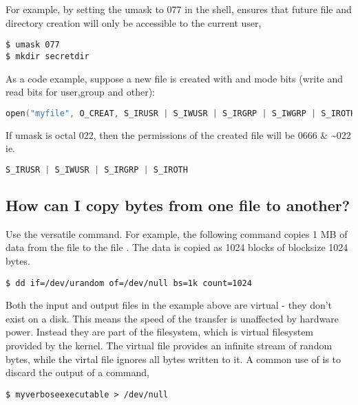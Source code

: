 For example, by setting the umask to 077 in the shell, ensures that future file and directory creation will only be accessible to the current user,

\begin{lstlisting}
$ umask 077
$ mkdir secretdir
\end{lstlisting}

As a code example, suppose a new file is created with  and mode bits  (write and read bits for user,group and other):

\begin{lstlisting}[language=C]
open("myfile", O_CREAT, S_IRUSR | S_IWUSR | S_IRGRP | S_IWGRP | S_IROTH | S_IWOTH);
\end{lstlisting}

If umask is octal 022, then the permissions of the created file will be 0666 \& \textasciitilde{}022 ie.

\begin{lstlisting}[language=C]
           S_IRUSR | S_IWUSR | S_IRGRP | S_IROTH
\end{lstlisting}

\subsection{How can I copy bytes from one file to another?}\label{how-can-i-copy-bytes-from-one-file-to-another}

Use the versatile  command. For example, the following command copies 1 MB of data from the file  to the file . The data is copied as 1024 blocks of blocksize 1024 bytes.

\begin{lstlisting}
$ dd if=/dev/urandom of=/dev/null bs=1k count=1024
\end{lstlisting}

Both the input and output files in the example above are virtual - they don't exist on a disk. This means the speed of the transfer is unaffected by hardware power. Instead they are part of the  filesystem, which is virtual filesystem provided by the kernel. The virtual file  provides an infinite stream of random bytes, while the virtal file  ignores all bytes written to it. A common use of  is to discard the output of a command,

\begin{lstlisting}
$ myverboseexecutable > /dev/null
\end{lstlisting}

